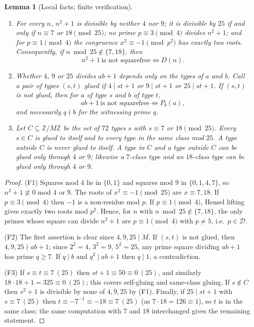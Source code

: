\documentclass[11pt,a4paper]{article}
\theoremstyle{plain}
\newtheorem{lemma}[theorem]{Lemma}
\theoremstyle{definition}
\theoremstyle{remark}
\newcommand{\Dset}{\mathcal{D}}
\newcommand{\Z}{\mathbb{Z}}
\begin{document}
\begin{lemma}[Local facts; finite verification]\label{lem:F1}
\begin{enumerate}
\item[(F1)] For every $n$, $n^2+1$ is divisible by neither $4$ nor $9$; it is divisible by $25$ if and
only if $n\equiv 7$ or $18\pmod{25}$; no prime $p\equiv 3\pmod 4$ divides $n^2+1$; and for
$p\equiv 1\pmod 4$ the congruence $x^2\equiv -1\pmod{p^2}$ has exactly two roots. Consequently, if
$n\bmod 25\notin\{7,18\}$, then
\[
 n^2+1\ \text{is not squarefree}\iff D(n).
\]
\item[(F2)] Whether $4$, $9$ or $25$ divides $ab+1$ depends only on the types of $a$ and $b$. Call a
pair of types $(s,t)$ \emph{glued} if $4\mid st+1$ or $9\mid st+1$ or $25\mid st+1$. If $(s,t)$ is not
glued, then for $a$ of type $s$ and $b$ of type $t$,
\[
 ab+1\ \text{is not squarefree}\iff P_b(a),
\]
and necessarily $q\nmid b$ for the witnessing prime $q$.
\item[(F3)] Let $C\subseteq\Z/M\Z$ be the set of $72$ types $s$ with $s\equiv 7$ or $18\pmod{25}$.
Every $s\in C$ is glued to itself and to every type in the same class mod $25$. A type outside $C$ is
never glued to itself. A type in $C$ and a type outside $C$ can be glued only through $4$ or $9$;
likewise a $7$-class type and an $18$-class type can be glued only through $4$ or $9$.
\end{enumerate}
\end{lemma}

\begin{proof}
(F1) Squares mod $4$ lie in $\{0,1\}$ and squares mod $9$ in $\{0,1,4,7\}$, so $n^2+1\not\equiv 0$
mod $4$ or $9$. The roots of $x^2\equiv-1\pmod{25}$ are $x\equiv 7,18$. If $p\equiv 3\pmod 4$ then
$-1$ is a non-residue mod $p$. If $p\equiv 1\pmod 4$, Hensel lifting gives exactly two roots mod
$p^2$. Hence, for $n$ with $n\bmod 25\notin\{7,18\}$, the only primes whose square can divide $n^2+1$
are $p\equiv 1\pmod 4$ with $p\ne 5$, i.e.\ $p\in\Dset$.

(F2) The first assertion is clear since $4,9,25\mid M$. If $(s,t)$ is not glued, then $4,9,25\nmid
ab+1$; since $2^2=4$, $3^2=9$, $5^2=25$, any prime square dividing $ab+1$ has prime $q\ge 7$. If
$q\mid b$ and $q^2\mid ab+1$ then $q\mid 1$, a contradiction.

(F3) If $s\equiv t\equiv 7\ (25)$ then $st+1\equiv 50\equiv 0\ (25)$, and similarly
$18\cdot 18+1=325\equiv 0\ (25)$; this covers self-gluing and same-class gluing. If $s\notin C$ then
$s^2+1$ is divisible by none of $4,9,25$ by (F1). Finally, if $25\mid st+1$ with $s\equiv 7\ (25)$ then
$t\equiv-7^{-1}\equiv-18\equiv 7\ (25)$ (as $7\cdot 18=126\equiv 1$), so $t$ is in the same class; the
same computation with $7$ and $18$ interchanged gives the remaining statement.
\end{proof}
\end{document}
